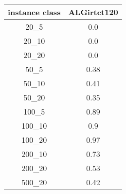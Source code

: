 \begin{tabular}{c|c|}
instance class & ALGirtct120 \\ 
\hline
20_5         & 0.0          \\ 
20_10        & 0.0          \\ 
20_20        & 0.0          \\ 
50_5         & 0.38         \\ 
50_10        & 0.41         \\ 
50_20        & 0.35         \\ 
100_5        & 0.89         \\ 
100_10       & 0.9          \\ 
100_20       & 0.97         \\ 
200_10       & 0.73         \\ 
200_20       & 0.53         \\ 
500_20       & 0.42         \\ 
\end{tabular}